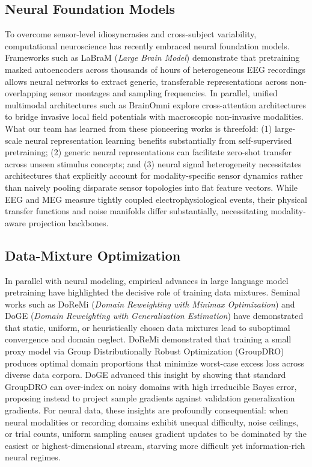 \documentclass[conference]{IEEEtran}
\begin{document}
\subsection{Neural Foundation Models}
To overcome sensor-level idiosyncrasies and cross-subject variability, computational neuroscience has recently embraced neural foundation models. Frameworks such as LaBraM (\emph{Large Brain Model}) \cite{jiang2024labram} demonstrate that pretraining masked autoencoders across thousands of hours of heterogeneous EEG recordings allows neural networks to extract generic, transferable representations across non-overlapping sensor montages and sampling frequencies. In parallel, unified multimodal architectures such as BrainOmni \cite{wu2024brainomni} explore cross-attention architectures to bridge invasive local field potentials with macroscopic non-invasive modalities. What our team has learned from these pioneering works is threefold: (1) large-scale neural representation learning benefits substantially from self-supervised pretraining; (2) generic neural representations can facilitate zero-shot transfer across unseen stimulus concepts; and (3) neural signal heterogeneity necessitates architectures that explicitly account for modality-specific sensor dynamics rather than naively pooling disparate sensor topologies into flat feature vectors. While EEG and MEG measure tightly coupled electrophysiological events, their physical transfer functions and noise manifolds differ substantially, necessitating modality-aware projection backbones.

\subsection{Data-Mixture Optimization}
In parallel with neural modeling, empirical advances in large language model pretraining have highlighted the decisive role of training data mixtures. Seminal works such as DoReMi (\emph{Domain Reweighting with Minimax Optimization}) \cite{xie2023doremi} and DoGE (\emph{Domain Reweighting with Generalization Estimation}) \cite{fan2023doge} have demonstrated that static, uniform, or heuristically chosen data mixtures lead to suboptimal convergence and domain neglect. DoReMi demonstrated that training a small proxy model via Group Distributionally Robust Optimization (GroupDRO) produces optimal domain proportions that minimize worst-case excess loss across diverse data corpora. DoGE advanced this insight by showing that standard GroupDRO can over-index on noisy domains with high irreducible Bayes error, proposing instead to project sample gradients against validation generalization gradients. For neural data, these insights are profoundly consequential: when neural modalities or recording domains exhibit unequal difficulty, noise ceilings, or trial counts, uniform sampling causes gradient updates to be dominated by the easiest or highest-dimensional stream, starving more difficult yet information-rich neural regimes.
\end{document}
